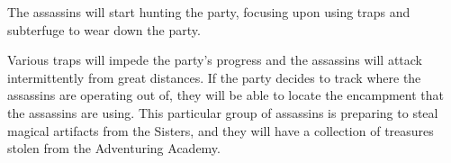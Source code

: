 The assassins will start hunting the party, focusing upon using traps and subterfuge to wear down the party.

Various traps will impede the party's progress and the assassins will attack intermittently from great distances.
If the party decides to track where the assassins are operating out of, they will be able to locate the encampment that the assassins are using.
This particular group of assassins is preparing to steal magical artifacts from the Sisters, and they will have a collection of treasures stolen from the Adventuring Academy.
